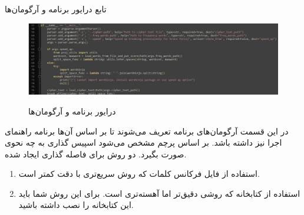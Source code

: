 \SubProblem
{تابع درایور برنامه و آرگومان‌ها}
{
\begin{figure}[H]
    \centering
    \includegraphics[width=15cm]{Images/F5.jpg}
    \label{fig:label}
    \caption{درایور برنامه و آرگومان‌ها}
\end{figure}

در این قسمت آرگومان‌های برنامه تعریف می‌شوند تا بر اساس آن‌ها برنامه راهنمای اجرا نیز داشته باشد. بر اساس پرچم
مشخص می‌شود اسپیس گذاری به چه نحوی صورت بگیرد.
دو روش برای فاصله گذاری ایجاد شده.

\begin{enumerate}
    \item
    استفاده از فایل فرکانس کلمات که روش سریع‌تری با دقت کمتر است.
    
    \item
    استفاده از کتابخانه
    که روشی دقیق‌تر اما آهسته‌تری است.
    برای این روش شما باید این کتابخانه را نصب داشته باشید.
\end{enumerate}
}
